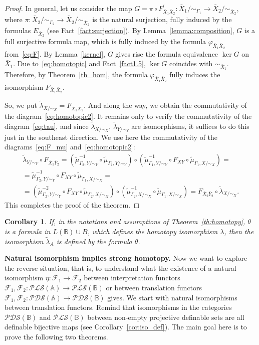 \documentclass[12pt]{article}
\newtheorem{corollary}{Corollary}
\theoremstyle{definition}
\def\MA{{\mathbb{A}}}
\def\MB{{\mathbb{B}}}
\def\F{{\mathcal{F}}}
\def\PLS{{\mathcal{PLS}}}
\def\PDS{{\mathcal{PDS}}}
\begin{document}
\begin{proof}
In general, let us consider  the map $G=\pi\circ F^\prime_{\bar X_1 \bar X_2}\colon \bar X_1/{\sim_{\Gamma_1}}\to \bar X_2/{\sim_{\bar X_2}}$, where $\pi\colon \bar X_2/{\sim_{\Gamma_2}} \to \bar X_2/{\sim_{\bar X_2}}$ is the natural surjection, fully induced by the formulas $E_{\bar X_2}$ (see Fact~\ref{fact:surjection}). By Lemma~\ref{lemma:composition}, $G$ is a full surjective formula map, which is fully induced by the formula $\varphi_{\bar X_1 \bar X_2}$ from~\eqref{eq:F}. By Lemma~\ref{kernel}, $G$ gives rise the formula equivalence $\ker G$ on $\bar X_1$. Due to~\eqref{eq:homotopic} and Fact~\ref{fact1.5}, $\ker G$ coincides with $\sim_{\bar X_1}$. Therefore, by Theorem~\ref{th_hom}, the formula $\varphi_{\bar X_1 \bar X_2}$ fully induces the isomorphism $F_{\bar X_1 \bar X_2}$. 

So, we put $\tilde\lambda_{X/{\sim_X}}=F_{\bar X_1 \bar X_2}$. And along the way, we obtain the commutativity of the diagram~\eqref{eq:homotopic2}. 
It remains only to verify the commutativity of the diagram~\eqref{eq:tau}, and since $\tilde\lambda_{X/{\sim_X}}$, $\tilde\lambda_{Y/{\sim_Y}}$ are isomorphisms, it suffices to do this just in the southeast direction. We use here the commutativity of the diagrams~\eqref{eq:F_mu} and~\eqref{eq:homotopic2}:
\begin{multline*}
\tilde\lambda_{Y/{\sim_Y}}\circ F_{\bar X_1 \bar Y_2}=(\tilde\mu_{\Gamma_2,Y/{\sim_Y}}^{-1}\circ \tilde\mu_{\Gamma_1,Y/{\sim_Y}})\circ (\tilde\mu_{\Gamma_1,Y/{\sim_Y}}^{-1}\circ F_{XY}\circ\tilde\mu_{\Gamma_1,X/{\sim_X}})=  \\
=\tilde\mu_{\Gamma_2,Y/{\sim_Y}}^{-1}\circ F_{XY}\circ\tilde\mu_{\Gamma_1,X/{\sim_X}}=\\
=(\tilde\mu_{\Gamma_2,Y/{\sim_Y}}^{-2}\circ F_{XY}\circ\tilde\mu_{\Gamma_2,X/{\sim_X}})\circ (\tilde\mu_{\Gamma_2,X/{\sim_X}}^{-1}\circ \tilde\mu_{\Gamma_1,X/{\sim_X}}) =F_{\bar X_2 \bar Y_2}\circ \tilde\lambda_{X/{\sim_X}}.
\end{multline*}
This completes the proof of the theorem.
\end{proof}

\begin{corollary}\label{cor:homotopy}
 If, in the notations and assumptions of Theorem~\ref{th:homotopy}, $\theta$ is a formula in $L(\MB)\cup B$, which defines the homotopy isomorphism $\lambda$, then the isomorphism $\tilde\lambda_{A}$ is defined by the formula $\theta$.
\end{corollary}

{\bf Natural isomorphism implies strong homotopy.} 
Now we want to explore the reverse situation, that is, to understand what the existence of a natural isomorphism $\eta\colon \F_1\to\F_2$ between interpretation functors $\F_1,\F_2\colon\PLS(\MA)\to\PLS(\MB)$ or between translation functors $\F_1,\F_2\colon\PDS(\MA)\to\PDS(\MB)$  gives. We start with natural isomorphisms between translation functors. Remind that isomorphisms in the categories $\PDS(\MB)$ and $\PLS(\MB)$ between non-empty projective definable sets are all definable bijective maps (see Corollary~\ref{cor:iso_def}). The main goal here is to prove the following two theorems. 
\end{document}
